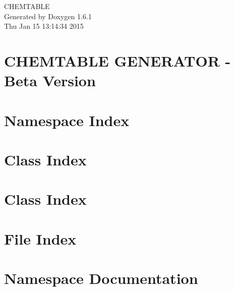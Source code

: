 \documentclass[a4paper]{book}
\begin{document}
\hypersetup{pageanchor=false}
\begin{titlepage}
\vspace*{7cm}
\begin{center}
{\Large CHEMTABLE }\\
\vspace*{1cm}
{\large Generated by Doxygen 1.6.1}\\
\vspace*{0.5cm}
{\small Thu Jan 15 13:14:34 2015}\\
\end{center}
\end{titlepage}
\clearemptydoublepage
{}
\tableofcontents
\clearemptydoublepage
{}
\hypersetup{pageanchor=true}
\chapter{CHEMTABLE GENERATOR -\/ Beta Version}
\label{index}\hypertarget{index}{}
\chapter{Namespace Index}

\chapter{Class Index}

\chapter{Class Index}

\chapter{File Index}

\chapter{Namespace Documentation}




\end{document}
